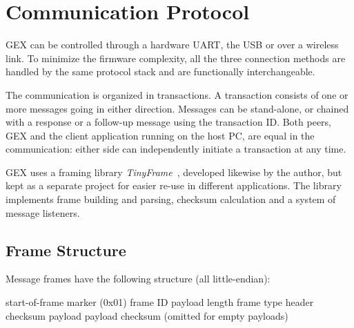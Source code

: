 \chapter{Communication Protocol} \label{sec:tinyframe}

GEX can be controlled through a hardware \gls{UART}, the \gls{USB} or over a wireless link. To minimize the firmware complexity, all the three connection methods are handled by the same protocol stack and are functionally interchangeable.

The communication is organized in transactions. A transaction consists of one or more messages going in either direction. Messages can be stand-alone, or chained with a response or a follow-up message using the transaction ID. Both peers, GEX and the client application running on the host PC, are equal in the communication: either side can independently initiate a transaction at any time.

GEX uses a framing library \textit{TinyFrame}~\cite{tinyframerepo}, developed likewise by the author, but kept as a separate project for easier re-use in different applications. The library implements frame building and parsing, checksum calculation and a system of message listeners.

\section{Frame Structure}

Message frames have the following structure (all little-endian):

\begin{boxedpayload}
	 start-of-frame marker (0x01)
	 frame ID
	 payload length
	 frame type
	 header checksum
	 payload
	 payload checksum (omitted for empty payloads)
\end{boxedpayload}

